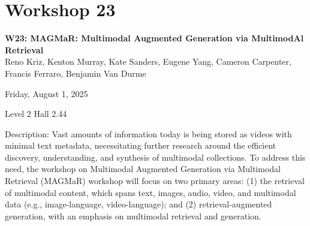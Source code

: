 \clearpage


\section[W23: MAGMaR: Multimodal Augmented Generation via MultimodAl Retrieval ]{Workshop 23}
\label{workshop_23}

\begin{center}
    {\Large \textbf{W23: MAGMaR: Multimodal Augmented Generation via MultimodAl Retrieval }}\\
    

Reno Kriz, Kenton Murray, Kate Sanders, Eugene Yang, Cameron Carpenter, Francis Ferraro, Benjamin Van Durme

    Friday, August 1, 2025

  Level 2 Hall 2.44
    
\end{center}

Description: Vast amounts of information today is being stored as videos with minimal text metadata, necessitating further research around the efficient discovery, understanding, and synthesis of multimodal collections. To address this need, the workshop on Multimodal Augmented Generation via Multimodal Retrieval (MAGMaR) workshop will focus on two primary areas: (1) the retrieval of multimodal content, which spans text, images, audio, video, and multimodal data (e.g., image-language, video-language); and (2) retrieval-augmented generation, with an emphasis on multimodal retrieval and generation.

